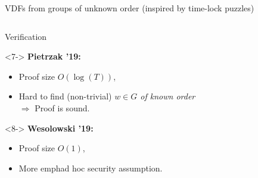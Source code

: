 \documentclass[aspectratio=169]{beamer}
\begin{document}
\begin{frame}{VDFs from groups of unknown order
    {\small (inspired by time-lock puzzles)}}
\begin{columns}
\begin{column}{0.37\textwidth}
{\begin{block}{Verification}
          \smallskip
          \begin{uncoverenv}<7->
            \textbf{Pietrzak '19:}
            \begin{itemize}
            \item Proof size \emph{$O(\log(T))$},
            \item Hard to find (non-trivial) \emph{$w\in G$ of known order}\\
              $\Rightarrow$ Proof is sound.
            \end{itemize}
          \end{uncoverenv}

          \smallskip
          \begin{uncoverenv}<8->
            \textbf{Wesolowski '19:}
            \begin{itemize}
            \item Proof size \emph{$O(1)$},
            \item More emph{ad hoc} security assumption.
            \end{itemize}
          \end{uncoverenv}
        \end{block}
      }
    \end{column}
  \end{columns}
\end{frame}

\end{document}
